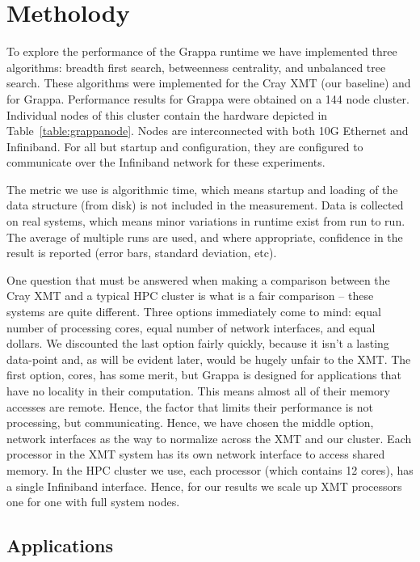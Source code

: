 \section{Metholody} \label{sec:method}

To explore the performance of the Grappa runtime we have implemented three algorithms: breadth first search, betweenness centrality, and unbalanced tree search.  These algorithms were implemented for the Cray XMT (our baseline) and for Grappa.  Performance results for Grappa were obtained on a 144 node cluster.  Individual nodes of this cluster contain the hardware depicted in Table~\ref{table:grappanode}.  Nodes are interconnected with both 10G Ethernet and Infiniband.  For all but startup and configuration, they are configured to communicate over the Infiniband network for these experiments.

The metric we use is algorithmic time, which means startup and loading of the data structure (from disk) is not included in the measurement.  Data is collected on real systems, which means minor variations in runtime exist from run to run.  The average of multiple runs are used, and where appropriate, confidence in the result is reported (error bars, standard deviation, etc).

One question that must be answered when making a comparison between the Cray XMT and a typical HPC cluster is what is a fair comparison -- these systems are quite different.  Three options immediately come to mind: equal number of processing cores, equal number of network interfaces, and equal dollars.  We discounted the last option fairly quickly, because it isn't a lasting data-point and, as will be evident later, would be hugely unfair to the XMT.  The first option, cores, has some merit, but Grappa is designed for applications that have no locality in their computation.  This means almost all of their memory accesses are remote.  Hence, the factor that limits their performance is not processing, but communicating.  Hence, we have chosen the middle option, network interfaces as the way to normalize across the XMT and our cluster.  Each processor in the XMT system has its own network interface to access shared memory.  In the HPC cluster we use, each processor (which contains 12 cores), has a single Infiniband interface.  Hence, for our results we scale up XMT processors one for one with full system nodes.

\subsection{Applications}

